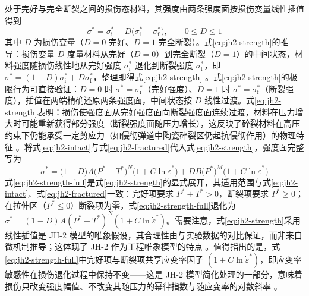 处于完好与完全断裂之间的损伤态材料，其强度由两条强度面按损伤变量线性插值得到
\begin{equation}
  \sigma^{*}
  =\sigma^{*}_{\mathrm{i}}-D\bigl(\sigma^{*}_{\mathrm{i}}-\sigma^{*}_{\mathrm{f}}\bigr),
  \qquad 0\le D\le1
  \label{eq:jh2-strength}
\end{equation}
其中 $D$ 为损伤变量（$D=0$ 完好、$D=1$ 完全断裂）。式\eqref{eq:jh2-strength}的推导：损伤变量 $D$ 度量材料从完好（$D=0$）到完全断裂（$D=1$）的中间状态，材料强度随损伤线性地从完好强度 $\sigma^{*}_{\mathrm{i}}$ 退化到断裂强度 $\sigma^{*}_{\mathrm{f}}$，即 $\sigma^{*}=(1-D)\sigma^{*}_{\mathrm{i}}+D\sigma^{*}_{\mathrm{f}}$，整理即得式\eqref{eq:jh2-strength} \cite{JohnsonHolmquist1994}。式\eqref{eq:jh2-strength}的极限行为可直接验证：$D=0$ 时 $\sigma^{*}=\sigma^{*}_{\mathrm{i}}$（完好强度）、$D=1$ 时 $\sigma^{*}=\sigma^{*}_{\mathrm{f}}$（断裂强度），插值在两端精确还原两条强度面，中间状态按 $D$ 线性过渡。式\eqref{eq:jh2-strength}表明：损伤使强度面从完好强度面向断裂强度面连续过渡，材料在压力增大时可能重新获得部分强度（断裂强度面随压力增长），这反映了碎裂材料在高压约束下仍能承受一定剪应力（如侵彻弹道中陶瓷碎裂区仍起抗侵彻作用）的物理特征 \cite{JohnsonHolmquist1999}。将式\eqref{eq:jh2-intact}与式\eqref{eq:jh2-fractured}代入式\eqref{eq:jh2-strength}，强度面完整写为
\begin{equation}
  \sigma^{*}
  =\bigl(1-D\bigr)A\bigl(P^{*}+T^{*}\bigr)^{N}\bigl(1+C\ln\dot{\varepsilon}^{*}\bigr)
  +DB\bigl(P^{*}\bigr)^{M}\bigl(1+C\ln\dot{\varepsilon}^{*}\bigr)
  \label{eq:jh2-strength-full}
\end{equation}
式\eqref{eq:jh2-strength-full}是式\eqref{eq:jh2-strength}的显式展开，其适用范围与式\eqref{eq:jh2-intact}、式\eqref{eq:jh2-fractured}一致：完好项要求 $P^{*}+T^{*}>0$，断裂项要求 $P^{*}\ge0$；在拉伸区（$P^{*}\le0$）断裂项为零，式\eqref{eq:jh2-strength-full}退化为 $\sigma^{*}=(1-D)A(P^{*}+T^{*})^{N}(1+C\ln\dot{\varepsilon}^{*})$。需要注意，式\eqref{eq:jh2-strength}采用线性插值是 JH-2 模型的唯象假设，其合理性由与实验数据的对比保证，而非来自微机制推导；这体现了 JH-2 作为工程唯象模型的特点 \cite{JohnsonHolmquist1994}。值得指出的是，式\eqref{eq:jh2-strength-full}中完好项与断裂项共享应变率因子 $(1+C\ln\dot{\varepsilon}^{*})$，即应变率敏感性在损伤退化过程中保持不变——这是 JH-2 模型简化处理的一部分，意味着损伤只改变强度幅值、不改变其随压力的幂律指数与随应变率的对数斜率 \cite{JohnsonHolmquist1994,JohnsonHolmquist1999}。

